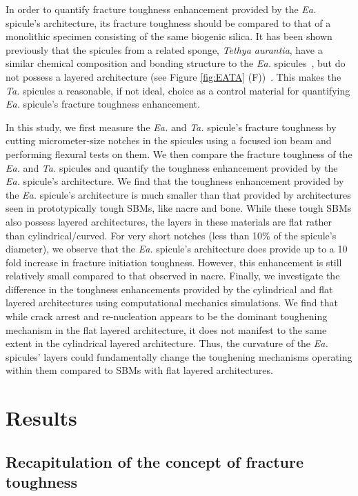 \documentclass[12pt,onecolumn]{article}
\makeatletter
\newcommand{\TA}{\textit{Ta.\@}\xspace}
\newcommand{\EA}{\textit{Ea.\@}\xspace}
\makeatother
\begin{document}
In order to quantify fracture toughness enhancement provided by the \EA spicule's architecture, its fracture toughness should be compared to that of a monolithic specimen consisting of the same biogenic silica. It has been shown previously that the spicules from a related sponge, \textit{Tethya aurantia}, have a similar chemical composition and bonding structure to the \EA spicules~\cite{weaver2010unifying}, but do not possess a layered architecture (see Figure \ref{fig:EATA} (F))~\cite{monn2017new}. This makes the \TA spicules a reasonable, if not ideal, choice as a control material for quantifying \EA spicule's fracture toughness enhancement. 

In this study, we first measure the \EA and \TA spicule's fracture toughness by cutting micrometer-size notches in the spicules using a focused ion beam and performing flexural tests on them. 
%
We then compare the fracture toughness of the \EA and \TA spicules and quantify the toughness enhancement provided by the \EA spicule's architecture. We find that the toughness enhancement provided by the \EA spicule's architecture is much smaller than that provided by architectures seen in prototypically tough SBMs, like nacre and bone. While these tough SBMs also possess layered architectures, the layers in these materials are flat rather than cylindrical/curved. 
%
For very short notches (less than 10\% of the spicule's diameter), we observe that the \EA spicule's architecture does provide up to a 10 fold increase in fracture initiation toughness. However, this enhancement is still relatively small compared to that observed in nacre. 
%
Finally, we investigate the difference in the toughness enhancements provided by the cylindrical and flat layered architectures using computational mechanics simulations. 
%
We find that while crack arrest and re-nucleation appears to be the dominant toughening mechanism in the flat layered architecture, it does not manifest to the same extent in the cylindrical layered architecture. Thus, the curvature of the \EA spicules' layers could fundamentally change the toughening mechanisms operating within them compared to SBMs with flat layered architectures.

\section*{Results}
\label{sec:res}

\subsection*{Recapitulation of the concept of fracture toughness}
\label{sec:tdef}
\end{document}
